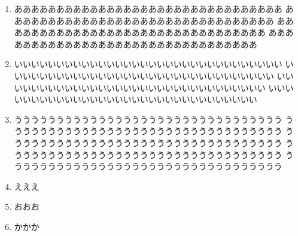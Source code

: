 \documentclass[a4j]{jarticle}
\begin{document}
%
\begin{rensyuumondai}
\begin{enumerate}[1.~]
\item ああああああああああああああああああああああああああああああああ
 ああああああああああああああああああああああああああああああああ
 ああああああああああああああああああああああああああああああああ
 ああああああああああああああああああああああああああああああああ
\item いいいいいいいいいいいいいいいいいいいいいいいいいいいいいいいい
 いいいいいいいいいいいいいいいいいいいいいいいいいいいいいいいい
 いいいいいいいいいいいいいいいいいいいいいいいいいいいいいいいい
 いいいいいいいいいいいいいいいいいいいいいいいいいいいいいいいい
\item うううううううううううううううううううううううううううううううう
 ううううううううううううううううううううううううううううううううう
 ううううううううううううううううううううううううううううううううう
 ううううううううううううううううううううううううううううううううう
 ううううううううううううううううううううううううううううううううう
\item えええ
\item おおお
\item かかか
\end{enumerate}
\end{rensyuumondai}
\end{document}

